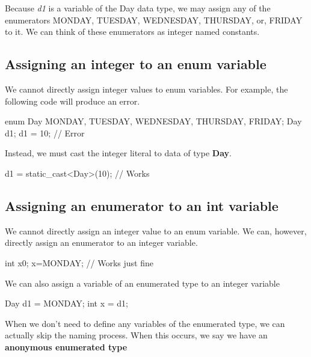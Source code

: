 \documentclass{report}
\begin{document}
	\bigbreak \noindent 
    Because \textit{d1} is a variable of the Day data type, we may assign any of the enumerators MONDAY, TUESDAY, WEDNESDAY, THURSDAY, or, FRIDAY to it.
    \bigbreak \noindent 
    We can think of these enumerators as integer named constants.

    \bigbreak \noindent 
    \subsection{Assigning an integer to an enum variable}
    \bigbreak \noindent 
    We cannot directly assign integer values to enum variables. For example, the following code will produce an error.
    \bigbreak \noindent 
    
    \begin{cppcode}
enum Day { MONDAY, TUESDAY, WEDNESDAY, THURSDAY, FRIDAY};
Day d1;
d1 = 10; // Error
    \end{cppcode}
    
    \bigbreak \noindent 
    Instead, we must cast the integer literal to data of type \textbf{Day}. 
    \bigbreak \noindent 
    
    \begin{cppcode}
d1 = static_cast<Day>(10); // Works
    \end{cppcode}
    

    \pagebreak  \bigbreak \noindent 
    \subsection{Assigning an enumerator to an int variable}
    \bigbreak \noindent 
    We cannot directly assign an integer value to an enum variable. We can, however, directly assign an enumerator to an integer variable.
    \bigbreak \noindent 
    
    \begin{cppcode}
int x{0};
x=MONDAY; // Works just fine
    \end{cppcode}
    
    \bigbreak \noindent 
    We can also assign a variable of an enumerated type to an integer variable
    \bigbreak \noindent 
    
    \begin{cppcode}
Day d1 = MONDAY;
int x = d1;
    \end{cppcode}
    
    \bigbreak \noindent 
    When we don't need to define any variables of the enumerated type, we can actually skip the naming process. When this occurs, we say we have an \textbf{anonymous enumerated type}
    \bigbreak \noindent 
\end{document}
